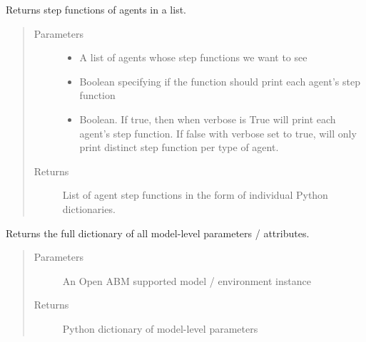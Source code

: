 \documentclass[letterpaper,10pt,english]{sphinxmanual}
\begin{document}
\begin{fulllineitems}
\label{\detokenize{index:oabm_tools.get_agent_step}}
Returns step functions of agents in a list.
\begin{quote}\begin{description}
\item[{Parameters}] \leavevmode\begin{itemize}
\item {} 
 \textendash{} A list of agents whose step functions we want to see

\item {} 
 \textendash{} Boolean specifying if the function should print each agent’s step function

\item {} 
 \textendash{} Boolean. If true, then when verbose is True will print each agent’s step function. If false with verbose set to true, will only print distinct step function per type of agent.

\end{itemize}

\item[{Returns}] \leavevmode
List of agent step functions in the form of individual Python dictionaries.

\end{description}\end{quote}

\end{fulllineitems}


\begin{fulllineitems}
\label{\detokenize{index:oabm_tools.get_model_parameters}}
Returns the full dictionary of all model-level parameters / attributes.
\begin{quote}\begin{description}
\item[{Parameters}] \leavevmode
{} \textendash{} An Open ABM supported model / environment instance

\item[{Returns}] \leavevmode
Python dictionary of model-level parameters

\end{description}\end{quote}

\end{fulllineitems}
\end{document}
